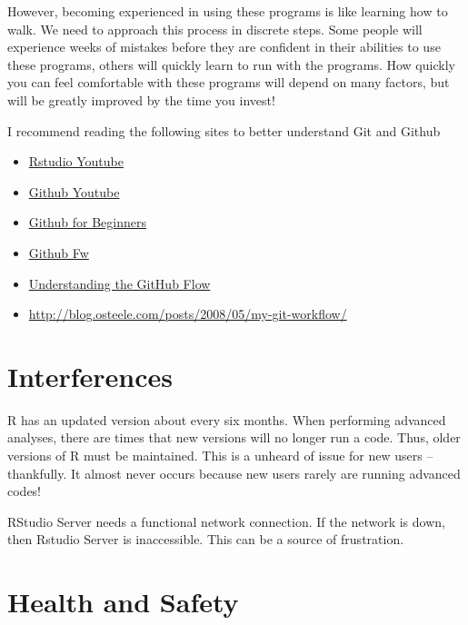 \documentclass[12pt]{../SOP4_alpha}\usepackage[]{graphicx}\usepackage[]{xcolor}
\begin{document}
\NP However, becoming experienced in using these programs is like learning how to walk. We need to approach this process in discrete steps. Some people will experience weeks of mistakes before they are confident in their abilities to use these programs, others will quickly learn to run with the programs. How quickly you can feel comfortable with these programs will depend on many factors, but will be greatly improved by the time you invest!

\NP I recommend reading the following sites to better understand Git and Github

\begin{itemize}
  \item \href{https://www.youtube.com/watch?v=uHYcDQDbMY8}{Rstudio Youtube}
  \item \href{https://www.youtube.com/watch?v=0fKg7e37bQE}{Github Youtube}
  \item \href{http://product.hubspot.com/blog/git-and-github-tutorial-for-beginners}{Github for Beginners}
  \item \href{http://scottchacon.com/2011/08/31/github-flow.html}{Github Fw}
  \item \href{https://guides.github.com/introduction/flow/}{Understanding the GitHub Flow}
  \item \href{http://blog.osteele.com/posts/2008/05/my-git-workflow/}{http://blog.osteele.com/posts/2008/05/my-git-workflow/}
  
\end{itemize}


\section{Interferences}

\NP R has an updated version about every six months. When performing advanced analyses, there are times that new versions will no longer run a code. Thus, older versions of R must be maintained. This is a unheard of issue for new users -- thankfully. It almost never occurs because new users rarely are running advanced codes!

\NP RStudio Server needs a functional network connection. If the network is down, then Rstudio Server is inaccessible. This can be a source of frustration. 

\section{Health and Safety}
\end{document}
